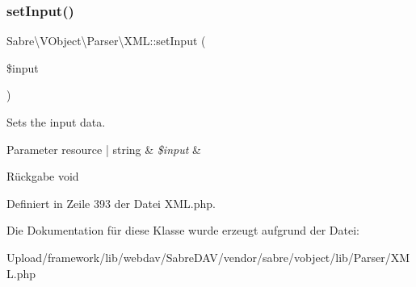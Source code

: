 \subsubsection{\texorpdfstring{set\+Input()}{setInput()}}
{\footnotesize\ttfamily Sabre\textbackslash{}\+V\+Object\textbackslash{}\+Parser\textbackslash{}\+X\+M\+L\+::set\+Input (\begin{DoxyParamCaption}\item[{}]{\$input }\end{DoxyParamCaption})}

Sets the input data.


\begin{DoxyParams}[1]{Parameter}
resource | string & {\em \$input} & \\
\hline
\end{DoxyParams}
\begin{DoxyReturn}{Rückgabe}
void 
\end{DoxyReturn}


Definiert in Zeile 393 der Datei X\+M\+L.\+php.



Die Dokumentation für diese Klasse wurde erzeugt aufgrund der Datei\+:\begin{DoxyCompactItemize}
\item 
Upload/framework/lib/webdav/\+Sabre\+D\+A\+V/vendor/sabre/vobject/lib/\+Parser/X\+M\+L.\+php\end{DoxyCompactItemize}
